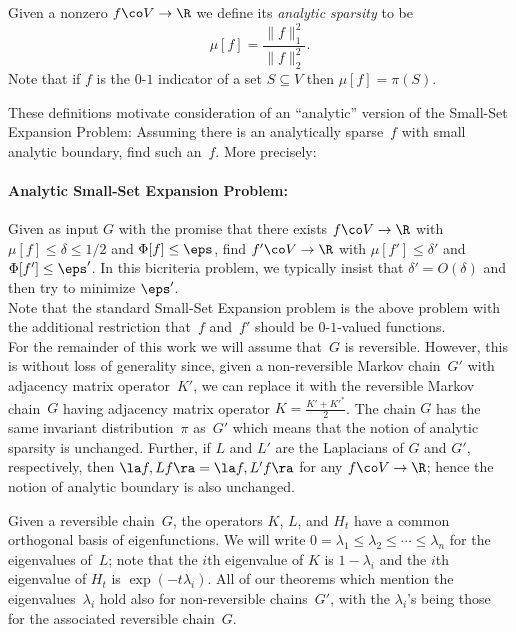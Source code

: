 \documentclass[11pt]{article}
\newcommand{\Bdry}{\Phi}
\newcommand{\Spars}{\mu}
\begin{document}
\begin{definition}
    Given a nonzero $f \co V \to \R$ we define its \emph{analytic sparsity} to be
    \[
        \Spars[f] = \frac{\|f\|_1^2}{\|f\|_2^2}.
    \]
    Note that if $f$ is the $0$-$1$ indicator of a set $S \subseteq V$ then $\Spars[f] = \pi(S)$.
\end{definition}

These definitions motivate consideration of an ``analytic'' version of the Small-Set Expansion Problem: Assuming there is an analytically sparse~$f$ with small analytic boundary, find such an~$f$.  More precisely:

\paragraph{Analytic Small-Set Expansion Problem:} Given as input $G$ with the promise that there exists $f \co V \to \R$ with $\Spars[f] \leq \delta \leq 1/2$ and $\Bdry[f] \leq \eps$, find $f' \co V \to \R$ with $\Spars[f'] \leq \delta'$ and $\Bdry[f'] \leq \eps'$.  In this bicriteria problem, we typically insist that $\delta' = O(\delta)$ and then try to minimize $\eps'$. \\

\noindent Note that the standard Small-Set Expansion problem is the above problem with the additional restriction that~$f$ and~$f'$ should be $0$-$1$-valued functions.  \\

For the remainder of this work we will assume that~$G$ is reversible.  However, this is without loss of generality since, given a non-reversible Markov chain~$G'$ with adjacency matrix operator~$K'$, we can replace it with the reversible Markov chain~$G$ having adjacency matrix operator $K = \frac{K' + {K'}^*}{2}$.  The chain $G$ has the same invariant distribution~$\pi$ as~$G'$ which means that the notion of analytic sparsity is unchanged.  Further, if $L$ and $L'$ are the Laplacians of $G$ and $G'$, respectively, then $\la f, L f \ra = \la f, L' f \ra$ for any $f \co V \to \R$; hence the notion of analytic boundary is also unchanged.

Given a reversible chain~$G$, the operators $K$, $L$, and $H_t$ have a common orthogonal basis of eigenfunctions.  We will write $0 = \lambda_1 \leq \lambda_2 \leq \cdots \leq \lambda_{n}$ for the eigenvalues of~$L$; note that the $i$th eigenvalue of $K$ is $1 - \lambda_i$ and the $i$th eigenvalue of $H_t$ is $\exp(-t\lambda_i)$.  All of our theorems which mention the eigenvalues~$\lambda_i$ hold also for non-reversible chains~$G'$, with the $\lambda_i$'s being those for the associated reversible chain~$G$.
\end{document}
